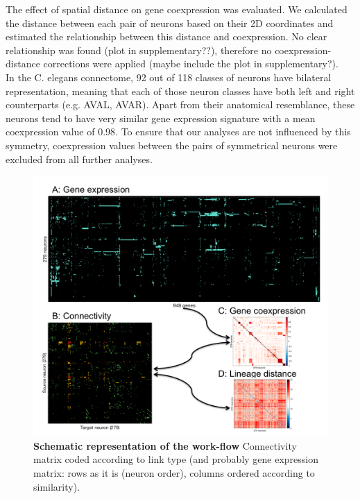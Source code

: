 \documentclass[10pt,letterpaper]{article}
\begin{document}
The effect of spatial distance on gene coexpression \cite{Fulcher2015} was evaluated. 
We calculated the distance between each pair of neurons based on their 2D coordinates and estimated the relationship between this distance and coexpression. 
No clear relationship was found (plot in supplementary??), therefore no coexpression-distance corrections were applied (maybe include the plot in supplementary?). \\
In the C. elegans connectome, 92 out of 118 classes of neurons have bilateral representation, meaning that each of those neuron classes have both left and right counterparts (e.g. AVAL, AVAR). 
Apart from their anatomical resemblance, these neurons tend to have very similar gene expression signature with a mean coexpression value of 0.98. 
To ensure that our analyses are not influenced by this symmetry, coexpression values between the pairs of symmetrical neurons were excluded from all further analyses.
 \begin{figure}[!ht]
  \centering
    \includegraphics[width=1\textwidth]{SchematicDATA}
 \caption{{\bf Schematic representation of the work-flow}
Connectivity matrix coded according to link type (and probably gene expression matrix: rows as it is (neuron order), columns ordered according to similarity).}
 \label{fig:SchematicRepresentation}
 \end{figure}
\end{document}
